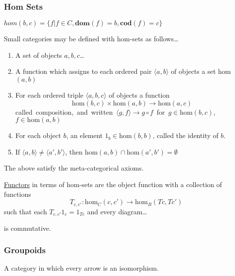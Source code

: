 \subsubsection{Hom Sets}\label{homset}
$hom(b,c) = \{f | f \in C, \textbf{dom}(f) = b, \textbf{cod}(f) = c \}$

\label{homsetcategories}

Small categories may be defined with hom-sets as follows\dots
\begin{enumerate}
  \item A set of objects $a,b,c$\dots
  \item A function which assigns to each ordered pair $\langle a, b \rangle$ of objects a set hom$(a,b)$
  \item For each ordered triple $\langle a,b,c \rangle$ of objects a function
  			$$\textrm{hom}(b,c)\times\textrm{hom}(a,b) \rightarrow \textrm{hom}(a,c)$$
  		\mbox{called composition, and written $\langle g,f \rangle \rightarrow g \circ f$ for $g \in \textrm{hom}(b,c)$, $f \in \textrm{hom}(a,b)$}
  \item For each object $b$, an element $1_b \in \textrm{hom}(b,b)$, called the identity of $b$.
  \item If $\langle a,b \rangle \neq \langle a',b' \rangle$, then $\textrm{hom}(a,b) \cap \textrm{hom}(a',b') = \emptyset$
\end{enumerate}

\noindent The above satisfy the meta-categorical axioms.\newline

\hyperref[functors]{Functors} in terms of hom-sets are the object function with a collection of functions\label{homfunctors}
$$T_{c,c'}:\textrm{hom}_C(c,c') \rightarrow \textrm{hom}_B(Tc,Tc')$$
such that each $T_{c,c'}1_c = 1_{Tc}$ and every diagram\dots

\begin{figure}[H]
  \centering
  
\end{figure}

\noindent is commutative.

\subsubsection{Groupoids}\label{groupoid}
A category in which every arrow is an isomorphism.